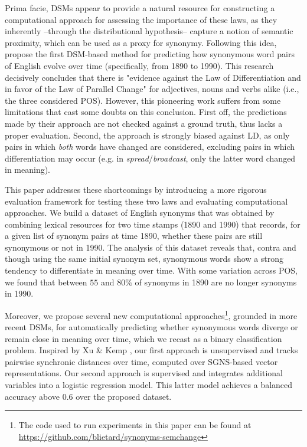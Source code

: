 \documentclass[11pt]{article}
\begin{document}
Prima facie, DSMs appear to provide a natural resource for constructing a computational approach for assessing the importance of these laws, as they inherently --through the distributional hypothesis-- capture a notion of semantic proximity, which can be used as a proxy for synonymy. Following this idea, \citet{xu-kemp-2015-evaluation} propose the first DSM-based method for predicting how synonymous word pairs of English evolve over time (specifically, from 1890 to 1990). This research decisively concludes that there is "evidence against the Law of Differentiation and in favor of the Law of Parallel Change" for adjectives, nouns and verbs alike (i.e., the three considered POS). However, this pioneering work suffers from some limitations that cast some doubts on this conclusion. First off, the predictions made by their approach are not checked against a ground truth, thus lacks a proper evaluation. Second, the approach is strongly biased against LD, as only pairs in which \textit{both} words have changed are considered, excluding pairs in which differentiation may occur (e.g. in \textit{spread}/\textit{broadcast}, only the latter word changed in meaning).

This paper addresses these shortcomings by introducing a more rigorous evaluation framework for testing these two laws and evaluating computational approaches. We build a dataset of English synonyms that was obtained by combining lexical resources for two time stamps (1890 and 1990) that records, for a given list of synonym pairs at time 1890, whether these pairs are still synonymous or not in 1990. The analysis of this dataset reveals that, contra \citet{xu-kemp-2015-evaluation} and though using the same initial synonym set, synonymous words show a strong tendency to differentiate in meaning over time. With some variation across POS, we found that between $55$ and $80\%$ of synonyms in 1890 are no longer synonyms in 1990.  

Moreover, we propose several new computational approaches\footnote{The code used to run experiments in this paper can be found at \url{https://github.com/blietard/synonyms-semchange}}, grounded in more recent DSMs, for automatically predicting whether synonymous words diverge or remain close in meaning over time, which we recast as a binary classification problem. Inspired by Xu \& Kemp , our first approach is unsupervised and tracks pairwise synchronic distances over time, computed over SGNS-based vector representations. Our second approach is supervised and integrates additional variables into a logistic regression model. This latter model achieves a balanced accuracy above $0.6$ over the proposed dataset.
\end{document}

